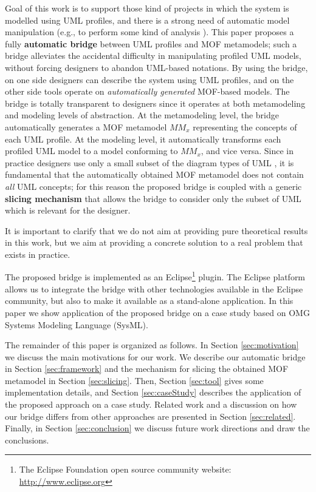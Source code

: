 Goal of this work is to support those kind of projects in which the system is modelled using UML profiles, and there is a strong need of automatic model manipulation (e.g., to perform some kind of analysis \cite{UMLprofilesAnalysis}).
This paper proposes a fully \textbf{automatic bridge} between UML profiles and MOF metamodels; such a bridge alleviates the accidental difficulty in manipulating profiled UML models, without forcing designers to abandon UML-based notations.
By using the bridge, on one side designers can describe the system using UML profiles, and on the other side tools operate
on \textit{automatically generated} MOF-based models.
The bridge is totally transparent to designers since it operates at both metamodeling and modeling levels of abstraction.
At the metamodeling level, the bridge automatically generates a MOF metamodel $MM_x$ representing the concepts of each UML profile.
At the modeling level, it automatically transforms each profiled UML model to a model conforming to $MM_x$, and vice versa.
Since in practice designers use only a small subset of the diagram types of UML \cite{france},
it is fundamental that the automatically obtained MOF metamodel does not contain \textit{all} UML concepts;
for this reason the proposed bridge is coupled with a generic \textbf{slicing mechanism} that allows the bridge to consider only the subset of UML which is relevant for the designer. 

It is important to clarify that we do not aim at providing pure theoretical results in this work, but we aim at providing
a concrete solution to a real problem that exists in practice.

The proposed bridge is implemented as an Eclipse\footnote{The Eclipse Foundation open source community website:
\small{\url{http://www.eclipse.org}}} plugin. The Eclipse platform allows us to integrate the bridge
with other technologies available in the Eclipse community, but also to make it available as a stand-alone application.
In this paper we show application of the proposed bridge on a case study based on OMG Systems Modeling Language (SysML).

The remainder of this paper is organized as follows. In Section \ref{sec:motivation} we discuss the main motivations for our work.
We describe our automatic bridge in Section \ref{sec:framework} and the mechanism for slicing the obtained MOF metamodel
in Section \ref{sec:slicing}.
Then, Section \ref{sec:tool} gives some implementation details, and Section \ref{sec:caseStudy} describes the application of
the proposed approach on a case study. Related work and a discussion on how our bridge differs from other approaches
are presented in Section \ref{sec:related}.
Finally, in Section \ref{sec:conclusion} we discuss future work directions and draw the conclusions.
